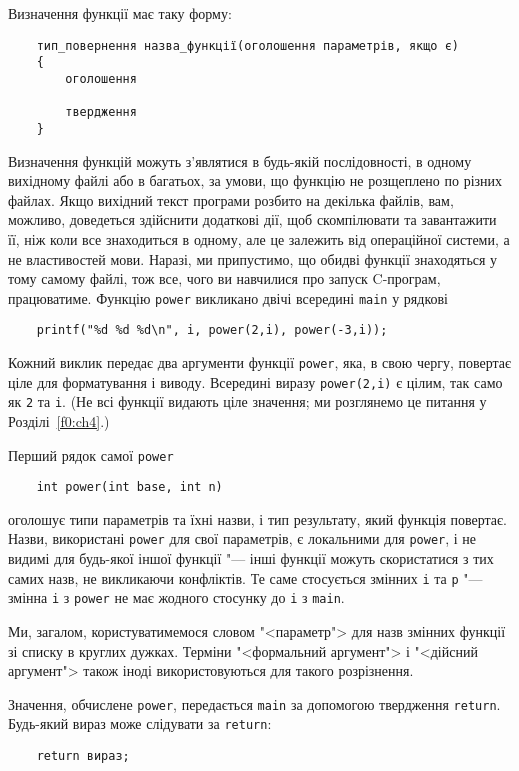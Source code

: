 \documentclass[a4paper,12pt]{book}
\begin{document}
  Визначення функції має таку форму:
  \begin{verbatim}
    тип_повернення назва_функції(оголошення параметрів, якщо є)
    {
        оголошення

        твердження
    }
  \end{verbatim}

  Визначення функцій можуть з'являтися в будь-якій послідовності, в одному вихідному файлі
  або в багатьох, за умови, що функцію не розщеплено по різних файлах. Якщо вихідний текст
  програми розбито на декілька файлів, вам, можливо, доведеться здійснити додаткові дії,
  щоб скомпілювати та завантажити її, ніж коли все знаходиться в одному, але це залежить
  від операційної системи, а не властивостей мови. Наразі, ми припустимо, що обидві
  функції знаходяться у тому самому файлі, тож все, чого ви навчилися про запуск
  C-програм, працюватиме. Функцію \texttt{power} викликано двічі всередині \texttt{main} у
  рядкові
  \begin{verbatim}
    printf("%d %d %d\n", i, power(2,i), power(-3,i));
  \end{verbatim}

  Кожний виклик передає два аргументи функції \texttt{power}, яка, в свою чергу, повертає
  ціле для форматування і виводу. Всередині виразу \texttt{power(2,i)} є цілим, так само
  як \texttt{2} та \texttt{i}. (Не всі функції видають ціле значення; ми розглянемо це
  питання у Розділі~\ref{f0:ch4}.)

  Перший рядок самої \texttt{power}
  \begin{verbatim}
    int power(int base, int n)
  \end{verbatim}
  оголошує типи параметрів та їхні назви, і тип результату, який функція повертає. Назви,
  використані \texttt{power} для свої параметрів, є локальними для \texttt{power},
  і не видимі для будь-якої іншої функції "--- інші функції можуть скористатися з тих
  самих назв, не викликаючи конфліктів. Те саме стосується змінних \texttt{i} та
  \texttt{p} "--- змінна \texttt{i} з \texttt{power} не має жодного стосунку до
  \texttt{i} з \texttt{main}.

  Ми, загалом, користуватимемося словом "<параметр"> для назв змінних функції зі
  списку в круглих дужках. Терміни "<формальний аргумент"> і "<дійсний
  аргумент"> також іноді використовуються для такого розрізнення.

  Значення, обчислене \texttt{power}, передається \texttt{main} за допомогою твердження
  \texttt{return}. Будь-який вираз може слідувати за \texttt{return}:
  \begin{verbatim}
    return вираз;
  \end{verbatim}
\end{document}
